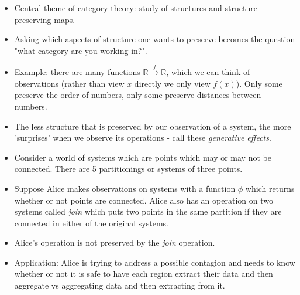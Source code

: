 \begin{itemize}
    \item  Central theme of category theory: study of structures and structure-preserving maps.
    \item  Asking which aspects of structure one wants to preserve becomes the question "what category are you working in?".
    \item    Example: there are many functions $\mathbb{R} \xrightarrow{f} \mathbb{R}$, which we can think of observations (rather than view $x$ directly we only view $f(x)$). Only some preserve the order of numbers, only some preserve distances between numbers.
    \item  The less structure that is preserved by our observation of a system, the more 'surprises' when we observe its operations - call these \emph{generative effects}.
    \item  Consider a world of systems which are points which may or may not be connected. There are 5 partitionings or systems of three points.
    \item  Suppose Alice makes observations on systems with a function $\phi$ which returns whether or not points are connected. Alice also has an operation on two systems called \emph{join} which puts two points in the same partition if they are connected in either of the original systems.
    \item  Alice's operation is not preserved by the \emph{join} operation.
    \item  Application: Alice is trying to address a possible contagion and needs to know whether or not it is safe to have each region extract their data and then aggregate vs aggregating data and then extracting from it.
  \end{itemize}